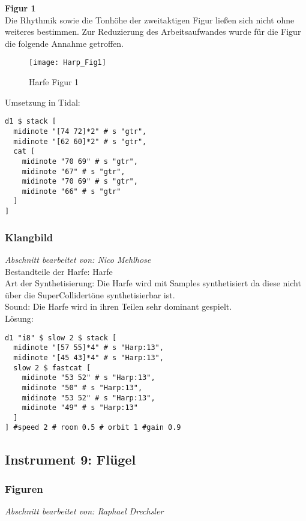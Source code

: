 \documentclass[
10pt, %
a4paper, %
oneside, %
headinclude,footinclude, %
BCOR5mm, %
]{scrartcl}
\begin{document}
\noindent\textbf{Figur 1}\\
Die Rhythmik sowie die Tonhöhe der zweitaktigen Figur ließen sich nicht ohne weiteres bestimmen. Zur Reduzierung des Arbeitsaufwandes wurde für die Figur die folgende Annahme getroffen. 
\begin{figure}[h]
	\centering 
	\texttt{[image: Harp\_Fig1]} 
	\caption{Harfe Figur 1}
\end{figure}

\noindent Umsetzung in Tidal:
\begin{lstlisting}
d1 $ stack [
  midinote "[74 72]*2" # s "gtr",
  midinote "[62 60]*2" # s "gtr",
  cat [
    midinote "70 69" # s "gtr",
    midinote "67" # s "gtr",
    midinote "70 69" # s "gtr",
    midinote "66" # s "gtr"
  ]
] 
\end{lstlisting}



\subsubsection{Klangbild}
\textit{Abschnitt bearbeitet von: Nico Mehlhose}\\

\noindent Bestandteile der Harfe: Harfe\\
Art der Synthetisierung: Die Harfe wird mit Samples\cite{Orch} synthetisiert da diese nicht über die SuperCollidertöne synthetisierbar ist.\\
Sound: Die Harfe wird in ihren Teilen sehr dominant gespielt.\\
Lösung:
\begin{lstlisting}
d1 "i8" $ slow 2 $ stack [
  midinote "[57 55]*4" # s "Harp:13",
  midinote "[45 43]*4" # s "Harp:13",
  slow 2 $ fastcat [
    midinote "53 52" # s "Harp:13",
    midinote "50" # s "Harp:13",
    midinote "53 52" # s "Harp:13",
    midinote "49" # s "Harp:13"
  ]
] #speed 2 # room 0.5 # orbit 1 #gain 0.9
\end{lstlisting}


\subsection{Instrument 9: Flügel}
\subsubsection{Figuren}
\textit{Abschnitt bearbeitet von: Raphael Drechsler}\\
\end{document}
